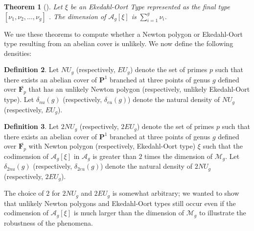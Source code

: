 \documentclass{article}
\newtheorem{theorem}{Theorem}[section]
\theoremstyle{remark}
\theoremstyle{definition}
\newtheorem{definition}[theorem]{Definition}
\begin{document}
\begin{theorem}[]
    \label{eodim}
    Let $\xi$ be an Ekedahl-Oort Type represented as the final type $[\nu_1,\nu_2,\ldots,\nu_g]$ . The dimension of $\mathcal{A}_g[\xi]$ is $\sum_{i=1}^g \nu_i$.
\end{theorem}
We use these theorems to compute whether a Newton polygon or Ekedahl-Oort type resulting from an abelian cover is unlikely. We now define the following densities:

\begin{definition}
    Let $NU_g$ (respectively, $EU_g$) denote the set of primes $p$ such that there exists an abelian cover of $\mathbf{P}^1$ branched at three points of genus $g$ defined over $\overline{\mathbf{F}_p}$ that has an unlikely Newton polygon (respectively, unlikely Ekedahl-Oort type). Let $\delta_{nu}(g)$ (respectively, $\delta_{eu}(g)$) denote the natural density of $NU_g$ (respectively, $EU_g$).
\end{definition}

\begin{definition}
    Let $2NU_g$ (respectively, $2EU_g$) denote the set of primes $p$ such that there exists an abelian cover of $\mathbf{P}^1$ branched at three points of genus $g$ defined over $\overline{\mathbf{F}_p}$ with Newton polygon (respectively, Ekedahl-Oort type) $\xi$ such that the codimension of $\mathcal{A}_g[\xi]$ in $\mathcal{A}_g$ is greater than $2$ times the dimension of $\mathcal{M}_g$. Let $\delta_{2nu}(g)$ (respectively, $\delta_{2eu}(g)$) denote the natural density of $2NU_g$ (respectively, $2EU_g$).
\end{definition}

\par The choice of $2$ for $2NU_g$ and $2EU_g$ is somewhat arbitrary; we wanted to show that unlikely Newton polygons and Ekedahl-Oort types still occur even if the codimension of $\mathcal{A}_g[\xi]$ is much larger than the dimension of $\mathcal{M}_g$ to illustrate the robustness of the phenomena.
\end{document}
